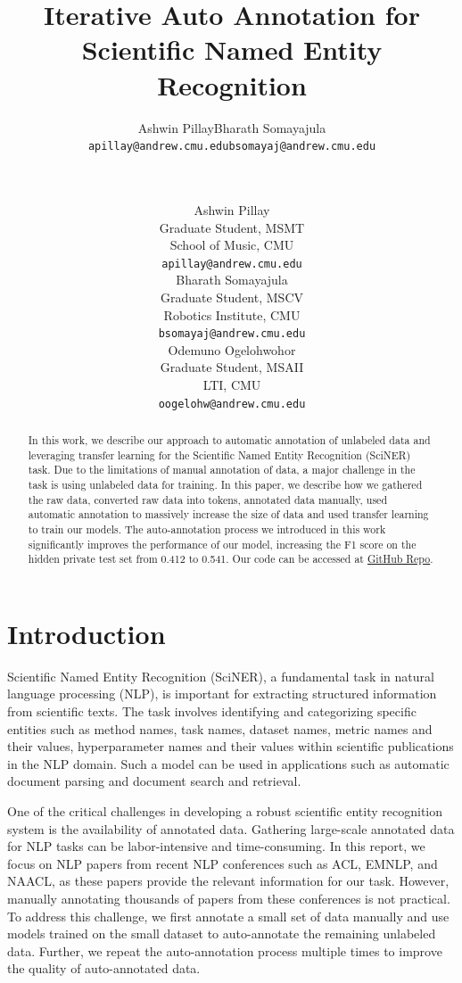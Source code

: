 \documentclass[11pt]{article}
\title{Iterative Auto Annotation for Scientific Named Entity Recognition}
\author{
  \begin{tabular}{cc}
    Ashwin Pillay & Bharath Somayajula \\
    \texttt{apillay@andrew.cmu.edu} & \texttt{bsomayaj@andrew.cmu.edu} \\
  \end{tabular} \\[0.5em]
  \multicolumn{1}{c}{Odemuno Ogelohwohor} \\
  \multicolumn{1}{c}{\texttt{oogelohw@andrew.cmu.edu}}
}
\author{Ashwin Pillay \\
  Graduate Student, MSMT \\
  School of Music, CMU\\
  \texttt{apillay@andrew.cmu.edu}\\\And
  Bharath Somayajula \\
  Graduate Student, MSCV \\
  Robotics Institute, CMU \\
  \texttt{bsomayaj@andrew.cmu.edu} \\\And
  Odemuno Ogelohwohor \\
  Graduate Student, MSAII\\
  LTI, CMU\\
  \texttt{oogelohw@andrew.cmu.edu} \\}
\begin{document}
\maketitle
\begin{abstract}
In this work, we describe our approach to automatic annotation of unlabeled data and leveraging transfer learning for the Scientific Named Entity Recognition (SciNER) task. Due to the limitations of manual annotation of data, a major challenge in the task is using unlabeled data for training. In this paper, we describe how we gathered the raw data, converted raw data into tokens, annotated data manually, used automatic annotation to massively increase the size of data and used transfer learning to train our models. The auto-annotation process we introduced in this work significantly improves the performance of our model, increasing the F1 score on the hidden private test set from 0.412 to 0.541. Our code can be accessed at \hyperlink{github.com/thebharathsk/scientific_entity_recognition}{GitHub Repo}. 
\end{abstract}

\section{Introduction}
Scientific Named Entity Recognition (SciNER), a fundamental task in natural language processing (NLP), is important for extracting structured information from scientific texts. The task involves identifying and categorizing specific entities such as method names, task names, dataset names, metric names and their values, hyperparameter names and their values within scientific publications in the NLP domain. Such a model can be used in applications such as automatic document parsing and document search and retrieval.

One of the critical challenges in developing a robust scientific entity recognition system is the availability of annotated data. Gathering large-scale annotated data for NLP tasks can be labor-intensive and time-consuming. In this report, we focus on NLP papers from recent NLP conferences such as ACL, EMNLP, and NAACL, as these papers provide the relevant information for our task. However, manually annotating thousands of papers from these conferences is not practical. To address this challenge, we first annotate a small set of data manually and use models trained on the small dataset to auto-annotate the remaining unlabeled data. Further, we repeat the auto-annotation process multiple times to improve the quality of auto-annotated data.
\end{document}
